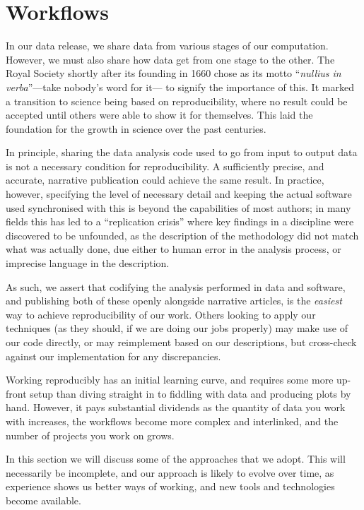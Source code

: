 \documentclass{article}
\begin{document}
\section{Workflows}\label{sec:workflows}

In our data release,
we share data from various stages of our computation.
However,
we must also share how data get from one stage to the other.
The Royal Society shortly after its founding in 1660
chose as its motto ``\emph{nullius in verba}''---take nobody's word for it---
to signify the importance of this.
It marked a transition to science being based on reproducibility,
where no result could be accepted until others were able to show it for themselves.
This laid the foundation for the growth in science over the past centuries.

In principle,
sharing the data analysis code used to go from input to output data
is not a necessary condition for reproducibility.
A sufficiently precise,
and accurate,
narrative publication
could achieve the same result.
In practice,
however,
specifying the level of necessary detail
and keeping the actual software used synchronised with this
is beyond the capabilities of most authors;
in many fields this has led to a ``replication crisis''
where key findings in a discipline were discovered to be unfounded,
as the description of the methodology did not match what was actually done,
due either to human error in the analysis process,
or imprecise language in the description.

As such,
we assert that codifying the analysis performed in data and software,
and publishing both of these openly alongside narrative articles,
is the \emph{easiest} way to achieve reproducibility of our work.
Others looking to apply our techniques
(as they should,
if we are doing our jobs properly)
may make use of our code directly,
or may reimplement based on our descriptions,
but cross-check against our implementation for any discrepancies.

Working reproducibly has an initial learning curve,
and requires some more up-front setup than diving straight in to
fiddling with data and producing plots by hand.
However,
it pays substantial dividends as the quantity of data you work with increases,
the workflows become more complex and interlinked,
and the number of projects you work on grows.

In this section we will discuss some of the approaches that we adopt.
This will necessarily be incomplete,
and our approach is likely to evolve over time,
as experience shows us better ways of working,
and new tools and technologies become available.
\end{document}
